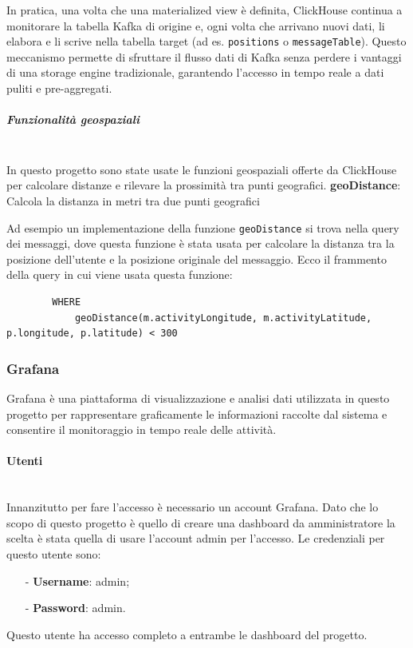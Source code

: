 \documentclass[10pt]{article}
\newcommand{\myparagraph}[1]{\paragraph{#1}\mbox{}\\}
\newcommand{\mysubparagraph}[1]{\subparagraph{#1}\mbox{}\\}
\begin{document}
        In pratica, una volta che una materialized view è definita, ClickHouse continua a monitorare la tabella Kafka di origine e, ogni volta che arrivano nuovi dati, li elabora e li scrive nella tabella target (ad es. \texttt{positions} o \texttt{messageTable}). Questo meccanismo permette di sfruttare il flusso dati di Kafka senza perdere i vantaggi di una storage engine tradizionale, garantendo l'accesso in tempo reale a dati puliti e pre-aggregati.


        \mysubparagraph{Funzionalità geospaziali}
        In questo progetto sono state usate le funzioni geospaziali offerte da ClickHouse per calcolare distanze e rilevare la prossimità tra punti geografici.
        \textbf{geoDistance}: Calcola la distanza in metri tra due punti geografici

        Ad esempio un implementazione della funzione \texttt{geoDistance} si trova nella query dei messaggi, dove questa funzione è stata usata per calcolare la distanza tra la posizione dell'utente e la posizione originale del messaggio.
        Ecco il frammento della query in cui viene usata questa funzione:
        \begin{lstlisting}
        WHERE
            geoDistance(m.activityLongitude, m.activityLatitude, p.longitude, p.latitude) < 300
        \end{lstlisting}

        \subsubsection{Grafana}
        Grafana è una piattaforma di visualizzazione e analisi dati utilizzata in questo progetto per rappresentare graficamente le informazioni raccolte dal sistema e consentire il monitoraggio in tempo reale delle attività.
        
        \myparagraph{Utenti}
        Innanzitutto per fare l'accesso è necessario un account Grafana. 
        Dato che lo scopo di questo progetto è quello di creare una dashboard da amministratore la scelta è stata quella di usare l'account admin per l'accesso.
        Le credenziali per questo utente sono:
        \begin{itemize}
            \item[-] \textbf{Username}: admin;
            \item[-] \textbf{Password}: admin.
        \end{itemize}
        Questo utente ha accesso completo a entrambe le dashboard del progetto.
\end{document}
